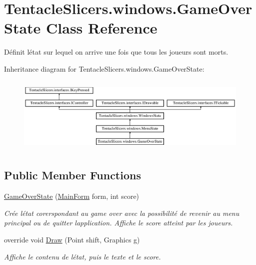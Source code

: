 \hypertarget{class_tentacle_slicers_1_1windows_1_1_game_over_state}{}\section{Tentacle\+Slicers.\+windows.\+Game\+Over\+State Class Reference}
\label{class_tentacle_slicers_1_1windows_1_1_game_over_state}


Définit l\textquotesingle{}état sur lequel on arrive une fois que tous les joueurs sont morts.  


Inheritance diagram for Tentacle\+Slicers.\+windows.\+Game\+Over\+State\+:\begin{figure}[H]
\begin{center}
\leavevmode
\includegraphics[height=3.703704cm]{class_tentacle_slicers_1_1windows_1_1_game_over_state}
\end{center}
\end{figure}
\subsection*{Public Member Functions}
\begin{DoxyCompactItemize}
\item 
\hyperlink{class_tentacle_slicers_1_1windows_1_1_game_over_state_a83996b3500091f86e4b6c295f6b664bf}{Game\+Over\+State} (\hyperlink{class_tentacle_slicers_1_1windows_1_1_main_form}{Main\+Form} form, int score)
\begin{DoxyCompactList}\small\item\em Crée l\textquotesingle{}état corerspondant au game over avec la possibilité de revenir au menu principal ou de quitter l\textquotesingle{}application. Affiche le score atteint par les joueurs. \end{DoxyCompactList}\item 
override void \hyperlink{class_tentacle_slicers_1_1windows_1_1_game_over_state_ab2bdf6ae481b15e9a6c927cbd7e91756}{Draw} (Point shift, Graphics g)
\begin{DoxyCompactList}\small\item\em Affiche le contenu de l\textquotesingle{}état, puis le texte et le score. \end{DoxyCompactList}\end{DoxyCompactItemize}

